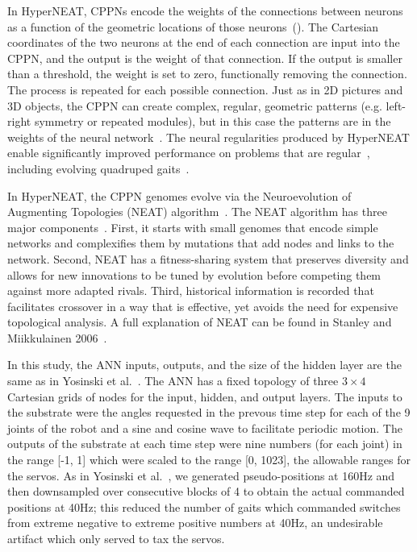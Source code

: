 In HyperNEAT, CPPNs encode the weights of the connections between neurons as a function of the geometric locations of those neurons~(). The Cartesian coordinates of the two neurons at the end of each connection are input into the CPPN, and the output is the weight of that connection. If the output is smaller than a threshold, the weight is set to zero, functionally removing the connection. The process is repeated for each possible connection. Just as in 2D pictures and 3D objects, the CPPN can create complex, regular, geometric patterns (e.g. left-right symmetry or repeated modules), but in this case the patterns are in the weights of the neural network~\cite{clune2011performance}. The neural regularities produced by HyperNEAT enable significantly improved performance on problems that are regular~\cite{clune2011performance,stanley2009hypercube}, including evolving quadruped gaits~\cite{clune2011performance,clune2009evolving,clune2009sensitivity}. 

In HyperNEAT, the CPPN genomes evolve via the Neuroevolution of Augmenting Topologies (NEAT) algorithm~\cite{stanley2006exploiting}. 
The NEAT algorithm has three major components~\cite{stanley2006exploiting}. 
First, it starts with small genomes that encode simple networks and complexifies them by mutations that add nodes and links to the network. Second, NEAT has a fitness-sharing system that preserves diversity and allows for new innovations to be tuned by evolution before competing them against more adapted rivals. 
Third, historical information is recorded that facilitates crossover in a way that is effective, yet avoids the need for expensive topological analysis. A full explanation of NEAT can be found in Stanley and Miikkulainen 2006~\cite{stanley2006exploiting}. 

In this study, the ANN inputs, outputs, and the size of the hidden layer are the same as in Yosinski et al.~\cite{yos:clune}. 
The ANN has a fixed topology of three \begin{math}3\times4\end{math} Cartesian grids of nodes for the input, hidden, and output layers. 
The inputs to the substrate were the angles requested in the prevous time step for each of the 9 joints of the robot and a sine and cosine wave to facilitate periodic motion. 
The outputs of the substrate at each time step were nine numbers (for each joint) in the range [-1, 1] which were scaled to the range [0, 1023], the allowable ranges for the servos. 
As in Yosinski et al.~\cite{yos:clune}, we generated pseudo-positions at 160Hz and then downsampled over consecutive blocks of 4 to obtain the actual commanded positions at 40Hz; this reduced the number of gaits which commanded switches from extreme negative to extreme positive numbers at 40Hz, an undesirable artifact which only served to tax the servos.



